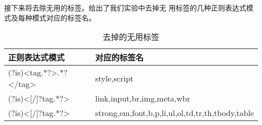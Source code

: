 接下来将去除无用的标签。给出了我们实验中去掉无
用标签的几种正则表达式模式及每种模式对应的标签名。
\begin{table}[h]
  \centering
\begin{tabular}{ll}
  \toprule
正则表达式模式 & 对应的标签名 \\
\hline
(?is)<tag.*?>.*?</tag> & style,script \\
(?is)<[/]?tag.*?> & link,input,br,img,meta,wbr \\
(?is)<[/]?tag.*?> & strong,em,font,b,p,li,ul,ol,td,tr,th,tbody,table \\
\bottomrule
\end{tabular}
  \caption{去掉的无用标签}
  \label{experiment:tab:uselesstags}
\end{table}
\begin{comment}
#+ORGTBL: SEND 无用标签 orgtbl-to-latex :splice nil :skip 0
| 正则表达式模式         | 对应的标签名                                     |
|------------------------+--------------------------------------------------|
| (?is)<tag.*?>.*?</tag> | style,script                                     |
| (?is)<[/]?tag.*?>      | link,input,br,img,meta,wbr                       |
| (?is)<[/]?tag.*?>      | strong,em,font,b,p,li,ul,ol,td,tr,th,tbody,table |
\end{comment}

